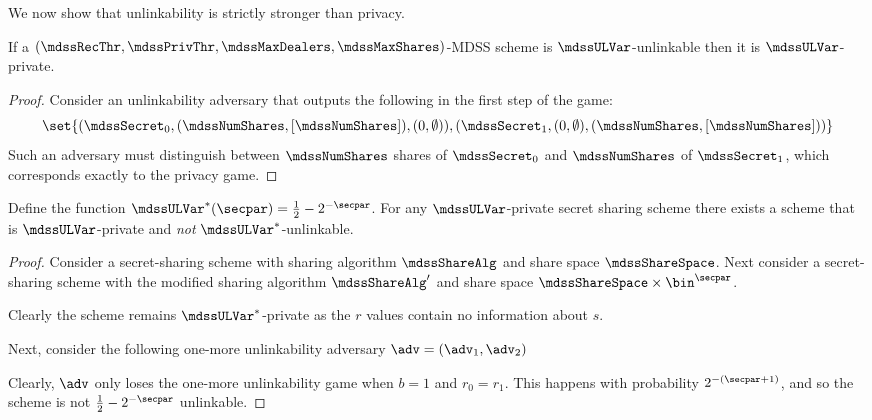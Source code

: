 We now show that unlinkability is strictly stronger than privacy.

\begin{lemma}
	If a $(\mdssRecThr, \mdssPrivThr, \mdssMaxDealers, \mdssMaxShares)$-MDSS scheme is $\mdssULVar$-unlinkable then it is $\mdssULVar$-private.
\end{lemma}
\begin{proof}
	Consider an unlinkability adversary that outputs the following in the first step of the game:
	$$
		\set{(\mdssSecret_0, (\mdssNumShares, [\mdssNumShares]), (0, \emptyset)), (\mdssSecret_1, (0, \emptyset), (\mdssNumShares, [\mdssNumShares]))}
	$$
	Such an adversary must distinguish between $\mdssNumShares$ shares of $\mdssSecret_0$ and $\mdssNumShares$ of $\mdssSecret_1$, which corresponds exactly to the privacy game.
\end{proof}

\begin{lemma}
	Define the function $\mdssULVar^*(\secpar) = \frac{1}{2} - 2^{-\secpar}$.
	For any $\mdssULVar$-private secret sharing scheme there exists a scheme that is $\mdssULVar$-private and \emph{not} $\mdssULVar^*$-unlinkable.
\end{lemma}

\begin{proof}
	Consider a secret-sharing scheme with sharing algorithm $\mdssShareAlg$ and share space $\mdssShareSpace$.
	Next consider a secret-sharing scheme with the modified sharing algorithm $\mdssShareAlg'$ and share space $\mdssShareSpace \times \bin^{\secpar}$.

	Clearly the scheme remains $\mdssULVar^*$-private as the $r$ values contain no information about $s$.

	Next, consider the following one-more unlinkability adversary $\adv = (\adv_1, \adv_2)$
	\begin{pchstack}[center, space=1em]

	\end{pchstack}
	Clearly, $\adv$ only loses the one-more unlinkability game when $b = 1$ and $r_0 = r_1$.
	This happens with probability $2^{-(\secpar + 1)}$, and so the scheme is not $\frac{1}{2} - 2^{-\secpar}$ unlinkable.
\end{proof}

